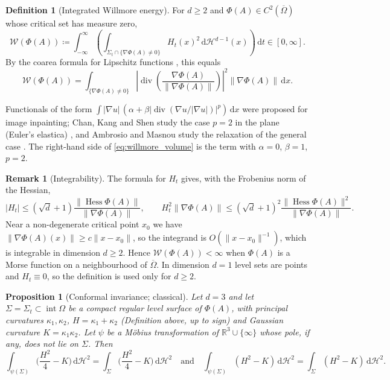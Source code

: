 \documentclass[11pt,a4paper,reqno]{amsart}
\newtheorem{proposition}[theorem]{Proposition}
\theoremstyle{definition}
\newtheorem{definition}[theorem]{Definition}
\newtheorem{remark}[theorem]{Remark}
\numberwithin{equation}{section}
\newcommand{\R}{\mathbb{R}}
\newcommand{\dif}{\,\mathrm{d}}
\newcommand{\Hess}{\operatorname{Hess}}
\begin{document}
\begin{definition}[Integrated Willmore energy]
For $d \ge 2$ and $\Phi(A) \in C^2(\overline{\Omega})$ whose critical set has measure zero,
\begin{equation}
    \mathcal{W}(\Phi(A)) \coloneqq \int_{-\infty}^\infty \left( \int_{\Sigma_t \cap \{\nabla\Phi(A) \ne 0\}} H_t(x)^2 \dif \mathcal{H}^{d-1}(x) \right) \dif t \in [0, \infty].
\end{equation}
By the coarea formula for Lipschitz functions \cite{evans2015measure}, this equals
\begin{equation}
    \mathcal{W}(\Phi(A)) = \int_{\{\nabla\Phi(A) \ne 0\}} \left| \operatorname{div}\left(\frac{\nabla \Phi(A)}{\|\nabla \Phi(A)\|}\right) \right|^2 \|\nabla \Phi(A)\| \dif x.
    \label{eq:willmore_volume}
\end{equation}
\end{definition}
Functionals of the form $\int |\nabla u|\,(\alpha + \beta|\operatorname{div}(\nabla u/|\nabla u|)|^p)\dif x$ were proposed for image inpainting; Chan, Kang and Shen study the case $p = 2$ in the plane (Euler's elastica) \cite{chan2003euler}, and Ambrosio and Masnou study the relaxation of the general case \cite{ambrosio2003direct}. The right-hand side of \eqref{eq:willmore_volume} is the term with $\alpha = 0$, $\beta = 1$, $p = 2$.

\begin{remark}[Integrability]
The formula for $H_t$ gives, with the Frobenius norm of the Hessian,
\begin{equation}
    |H_t| \le (\sqrt{d} + 1)\frac{\|\Hess \Phi(A)\|}{\|\nabla \Phi(A)\|}, \qquad H_t^2\|\nabla\Phi(A)\| \le (\sqrt{d}+1)^2 \frac{\|\Hess\Phi(A)\|^2}{\|\nabla \Phi(A)\|}.
\end{equation} Near a non-degenerate critical point $x_0$ we have $\|\nabla \Phi(A)(x)\| \ge c\|x - x_0\|$, so the integrand is $O(\|x - x_0\|^{-1})$, which is integrable in dimension $d \ge 2$. Hence $\mathcal{W}(\Phi(A)) < \infty$ when $\Phi(A)$ is a Morse function on a neighbourhood of $\overline{\Omega}$. In dimension $d = 1$ level sets are points and $H_t \equiv 0$, so the definition is used only for $d \ge 2$.
\end{remark}

\begin{proposition}[Conformal invariance; classical]
\label{thm:willmore_invariance}
Let $d = 3$ and let $\Sigma = \Sigma_t \subset \operatorname{int}\Omega$ be a compact regular level surface of $\Phi(A)$, with principal curvatures $\kappa_1, \kappa_2$, $H = \kappa_1 + \kappa_2$ (Definition above, up to sign) and Gaussian curvature $K = \kappa_1\kappa_2$. Let $\psi$ be a M\"obius transformation of $\R^3 \cup \{\infty\}$ whose pole, if any, does not lie on $\Sigma$. Then
\begin{equation}
    \int_{\psi(\Sigma)} \Big(\frac{H^2}{4} - K\Big) \dif \mathcal{H}^2 = \int_{\Sigma} \Big(\frac{H^2}{4} - K\Big) \dif \mathcal{H}^2
    \quad\text{and}\quad
    \int_{\psi(\Sigma)} (H^2 - K) \dif \mathcal{H}^2 = \int_{\Sigma} (H^2 - K) \dif \mathcal{H}^2.
\end{equation}
\end{proposition}
\end{document}
